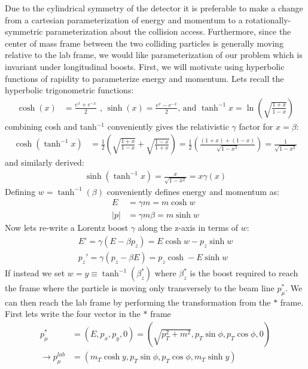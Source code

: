 Due to the cylindrical symmetry of the detector it is preferable to make a change
from a cartesian parameterization of energy and momentum to a rotationally-symmetric parameterization about
the collision access. Furthermore, since the center of mass frame between the two colliding particles is generally moving relative
 to the lab frame, we would like parameterization of our problem which is invariant under longitudinal boosts. First, 
we will motivate using hyperbolic functions of rapidity to parameterize energy and momentum. Lets recall the hyperbolic
trigonometric functions:
\begin{align*}
\cosh(x) &= \frac{e^{x} + e^{-x}}{2} \texttt{ , } \sinh (x) = \frac{e^{x} - e^{-x}}{2} \text{, and }\tanh^{-1}x = \ln \left( \sqrt{\frac{1+x}{1-x}} \right)
\end{align*}
combining cosh and tanh$^{-1}$ conveniently gives the relativistic $\gamma$ factor for $x=\beta$:
\begin{align*}
\cosh{(\tanh^{-1}{x})} &= \frac{1}{2} \left ( \sqrt{\frac{1+x}{1-x}} + \sqrt{\frac{1-x}{1+x}} \right ) = \frac{1}{2} \left( \frac{(1+x) + (1 -x)}{\sqrt{1-x^2}} \right)  = \frac{1}{\sqrt{1-x^2}}
\end{align*}
and similarly derived:
\begin{align*}
\sinh{(\tanh^{-1}{x})} = \frac{x}{\sqrt{1-x^2}} = x \gamma(x)
\end{align*}
Defining $w = \tanh^{-1}(\beta)$ conveniently defines energy and momentum as:
\begin{align*}
E &= \gamma m = m \cosh{w} \\
|p| &= \gamma m \beta  = m \sinh{w} 
\end{align*}
Now lets re-write a Lorentz boost $\gamma$ along the z-axis in terms of $w$:
\begin{align*} \label{eq:boost}
E' = \gamma (E - \beta p_z)   = E \cosh w - p_z \sinh w \\
p_z' = \gamma (p_z - \beta E) = p_z \cosh - E \sinh w
\end{align*}
If instead we set $w = y \equiv \tanh^{-1}(\beta_z^*)$ where $\beta_z^*$ is the boost required to reach the frame where the particle is
moving only transversely to the beam line $p_\mu^*$. We can then reach the lab frame by performing
 the transformation from the $*$ frame. First lets write the four vector in the $*$ frame
\begin{align*}
 p_\mu^* &= ( E , p_x, p_y, 0 ) = (\sqrt{p_T^2 + m^2}, p_T\sin \phi, p_T \cos \phi, 0)\\
\rightarrow  p_\mu^{lab} &= (m_T \cosh y, p_T \sin \phi, p_T \cos \phi, m_T \sinh y)
\end{align*}
